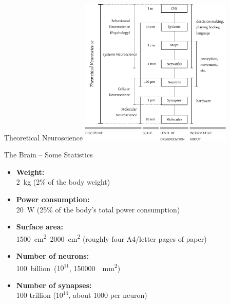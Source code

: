 \documentclass[handout,aspectratio=169]{beamer}
\begin{document}
\begin{frame}{Theoretical Neuroscience}
	\centering
	\includegraphics[height=7cm]{media/levels.pdf}
\end{frame}

\begin{frame}{The Brain -- Some Statistics}
	\begin{itemize}
		\item \textbf{Weight:}\\
		\SI{2}{\kilogram} (2\% of the body weight)
		\item \textbf{Power consumption:}\\
		\SI{20}{\watt} (25\% of the body's total power consumption)
		\item \textbf{Surface area:}\\
		\SIrange{1500}{2000}{\centi\metre\squared} (roughly four A4/letter pages of paper)
		\item \textbf{Number of neurons:}\\
		\SI{100} billion ($10^{11}$, \SI{150000}{\per\milli\metre\squared})
		\item \textbf{Number of synapses:}\\
		100 trillion ($10^{14}$, about $1000$ per neuron)
	\end{itemize}	
\end{frame}
\end{document}
